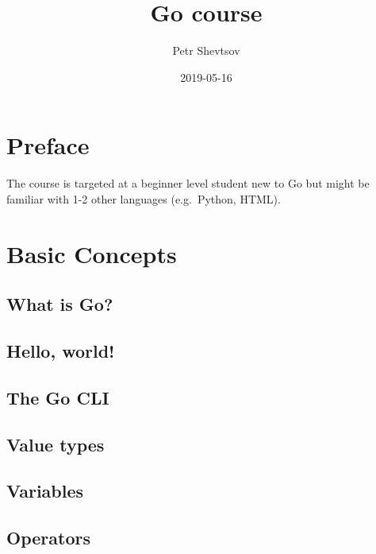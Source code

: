 \documentclass[]{book}
\title{Go course}
\author{Petr Shevtsov}
\date{2019-05-16}
\begin{document}
\maketitle

{
\setcounter{tocdepth}{1}
\tableofcontents
}
\hypertarget{preface}{%
\chapter*{Preface}\label{preface}}

The course is targeted at a beginner level student new to Go but might be
familiar with 1-2 other languages (e.g.~Python, HTML).

\hypertarget{basic-concepts}{%
\chapter{Basic Concepts}\label{basic-concepts}}

\hypertarget{what-is-go}{%
\section{What is Go?}\label{what-is-go}}

\hypertarget{hello-world}{%
\section{Hello, world!}\label{hello-world}}

\hypertarget{the-go-cli}{%
\section{The Go CLI}\label{the-go-cli}}

\hypertarget{value-types}{%
\section{Value types}\label{value-types}}

\hypertarget{variables}{%
\section{Variables}\label{variables}}

\hypertarget{operators}{%
\section{Operators}\label{operators}}
\end{document}
